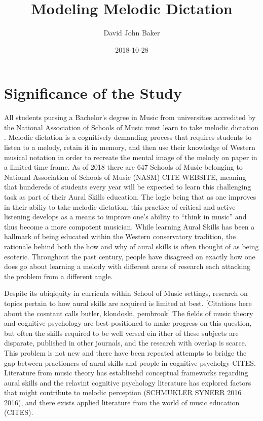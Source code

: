 \documentclass[]{book}
\title{Modeling Melodic Dictation}
\author{David John Baker}
\date{2018-10-28}
\theoremstyle{definition}
\theoremstyle{definition}
\theoremstyle{definition}
\theoremstyle{remark}
\begin{document}
\maketitle

{
\setcounter{tocdepth}{1}
\tableofcontents
}
\hypertarget{significance-of-the-study}{%
\chapter{Significance of the Study}\label{significance-of-the-study}}

All students pursing a Bachelor's degree in Music from universities
accredited by the National Association of Schools of Music must learn to
take melodic dictation \citep[ Section
VIII.6.B.2.A]{NationalAssociationSchools2018}. Melodic dictation is a
cognitively demanding process that requires students to listen to a
melody, retain it in memory, and then use their knowledge of Western
musical notation in order to recreate the mental image of the melody on
paper in a limited time frame. As of 2018 there are 647 Schools of Music
belonging to National Association of Schools of Music (NASM) CITE
WEBSITE, meaning that hundereds of students every year will be expected
to learn this challenging task as part of their Aural Skills education.
The logic being that as one improves in their abiliy to take melodic
dictation, this practice of critical and active listening develops as a
means to improve one's ability to ``think in music'' and thus become a
more compotent musician. While learning Aural Skills has been a hallmark
of being educated within the Western conservatory tradition, the
rationale behind both the how and why of aural skills is often thought
of as being esoteric. Throughout the past century, people have disagreed
on exactly how one does go about learning a melody with different areas
of research each attacking the problem from a different angle.

Despite its ubiqiquity in curricula within School of Music settings,
research on topics pertain to how aural skills are acquired is limited
at best. {[}Citations here about the cosntant calls butler, klondoski,
pembrook{]} The fields of music theory and cognitive psychology are best
positioned to make progress on this question, but often the skills
required to be well versed ein ither of these subjects are disparate,
published in other journals, and the research with overlap is scarce.
This problem is not new and there have been repeated attempts to bridge
the gap between practioners of aural skills and people in cognitive
psycholgy CITES. Literature from music theory has establisehd conceptual
frameworks regarding aural skills
\citet{karpinskiAuralSkillsAcquisition2000} and the relavint cognitive
psychology literature has explored factors that might contribute to
melodic perception (SCHMUKLER SYNERR 2016 2016), and there exists
applied literature from the world of music education (CITES).
\end{document}
